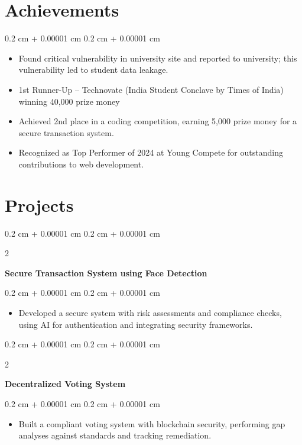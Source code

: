 \documentclass[10pt, letterpaper]{article}
\newenvironment{highlights}{
    \begin{itemize}[
        topsep=0.10 cm,
        parsep=0.10 cm,
        partopsep=0pt,
        itemsep=0pt,
        leftmargin=0.4 cm + 10pt
    ]
}{
    \end{itemize}
} %
\newenvironment{onecolentry}{
    \begin{adjustwidth}{
        0.2 cm + 0.00001 cm
    }{
        0.2 cm + 0.00001 cm
    }
}{
    \end{adjustwidth}
} %
\newenvironment{twocolentry}[2][]{
    \onecolentry
    \def\secondColumn{#2}
    \setcolumnwidth{\fill, 4.5 cm}
    \begin{paracol}{2}
}{
    \switchcolumn \raggedleft \secondColumn
    \end{paracol}
    \endonecolentry
} %
\begin{document}
    \section{Achievements}
    \begin{onecolentry}
        \begin{highlights}
            \item Found critical vulnerability in university site and reported to university; this vulnerability led to student data leakage.
            \item 1st Runner-Up – Technovate (India Student Conclave by Times of India) winning 40,000 prize money 
            \item Achieved 2nd place in a coding competition, earning 5,000 prize money for a secure transaction system.
            \item Recognized as Top Performer of 2024 at Young Compete for outstanding contributions to web development.
        \end{highlights}
    \end{onecolentry}

    \section{Projects}
    \begin{twocolentry}{}
        \textbf{Secure Transaction System using Face Detection}
    \end{twocolentry}
    \vspace{0.10 cm}
    \begin{onecolentry}
        \begin{highlights}
            \item Developed a secure system with risk assessments and compliance checks, using AI for authentication and integrating security frameworks.
        \end{highlights}
    \end{onecolentry}

    \vspace{0.2 cm}
    \begin{twocolentry}{}
        \textbf{Decentralized Voting System}
    \end{twocolentry}
    \vspace{0.10 cm}
    \begin{onecolentry}
        \begin{highlights}
            \item Built a compliant voting system with blockchain security, performing gap analyses against standards and tracking remediation.
        \end{highlights}
    \end{onecolentry}
\end{document}
